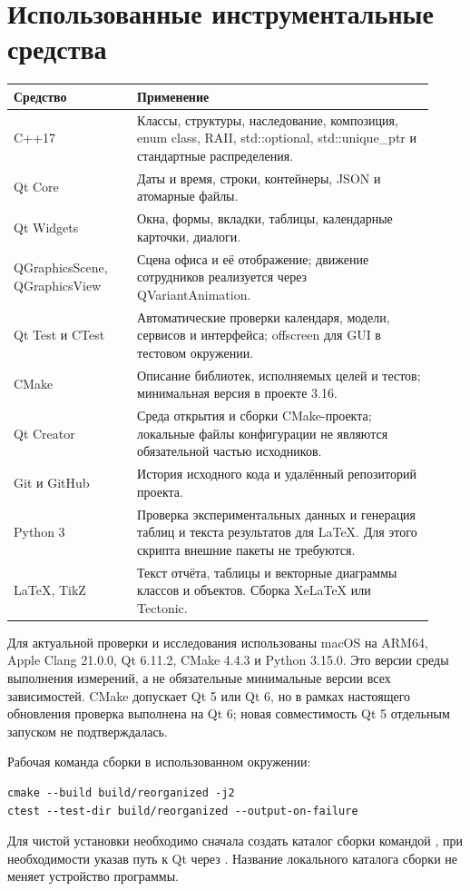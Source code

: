 \section{Использованные инструментальные средства}
\begin{longtable}{L{0.27\linewidth}L{0.65\linewidth}}
\toprule Средство & Применение \\\midrule\endhead
C++17 & Классы, структуры, наследование, композиция, enum class, RAII, std::optional, std::unique\_ptr и стандартные распределения. \\
Qt Core & Даты и время, строки, контейнеры, JSON и атомарные файлы. \\
Qt Widgets & Окна, формы, вкладки, таблицы, календарные карточки, диалоги. \\
QGraphicsScene, QGraphicsView & Сцена офиса и её отображение; движение сотрудников реализуется через QVariantAnimation. \\
Qt Test и CTest & Автоматические проверки календаря, модели, сервисов и интерфейса; offscreen для GUI в тестовом окружении. \\
CMake & Описание библиотек, исполняемых целей и тестов; минимальная версия в проекте 3.16. \\
Qt Creator & Среда открытия и сборки CMake-проекта; локальные файлы конфигурации не являются обязательной частью исходников. \\
Git и GitHub & История исходного кода и удалённый репозиторий проекта. \\
Python 3 & Проверка экспериментальных данных и генерация таблиц и текста результатов для LaTeX. Для этого скрипта внешние пакеты не требуются. \\
LaTeX, TikZ & Текст отчёта, таблицы и векторные диаграммы классов и объектов. Сборка XeLaTeX или Tectonic. \\
\bottomrule
\end{longtable}

Для актуальной проверки и исследования использованы macOS на ARM64, Apple Clang 21.0.0, Qt 6.11.2, CMake 4.4.3 и Python 3.15.0. Это версии среды выполнения измерений, а не обязательные минимальные версии всех зависимостей. CMake допускает Qt 5 или Qt 6, но в рамках настоящего обновления проверка выполнена на Qt 6; новая совместимость Qt 5 отдельным запуском не подтверждалась.

Рабочая команда сборки в использованном окружении:
\begin{lstlisting}
cmake --build build/reorganized -j2
ctest --test-dir build/reorganized --output-on-failure
\end{lstlisting}
Для чистой установки необходимо сначала создать каталог сборки командой , при необходимости указав путь к Qt через . Название локального каталога сборки не меняет устройство программы.
